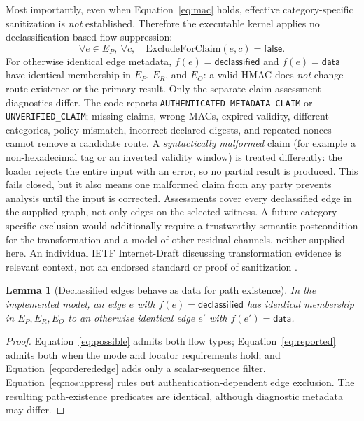 \documentclass[11pt,letterpaper]{article}
\newtheorem{lemma}{Lemma}
\newcommand{\st}[1]{\texttt{\scriptsize #1}}
\begin{document}
Most importantly, even when Equation~\eqref{eq:mac} holds, effective category-specific sanitization is \emph{not} established. Therefore the executable kernel applies no declassification-based flow suppression:
\begin{equation}
\forall e\in E_P,\ \forall c,\quad \mathrm{ExcludeForClaim}(e,c)=\mathsf{false}.\label{eq:nosuppress}
\end{equation}
For otherwise identical edge metadata, \(f(e)=\mathsf{declassified}\) and \(f(e)=\mathsf{data}\) have identical membership in \(E_P\), \(E_R\), and \(E_O\): a valid HMAC does \emph{not} change route existence or the primary result. Only the separate claim-assessment diagnostics differ. The code reports \st{AUTHENTICATED\_METADATA\_CLAIM} or \st{UNVERIFIED\_CLAIM}; missing claims, wrong MACs, expired validity, different categories, policy mismatch, incorrect declared digests, and repeated nonces cannot remove a candidate route. A \emph{syntactically malformed} claim (for example a non-hexadecimal tag or an inverted validity window) is treated differently: the loader rejects the entire input with an error, so no partial result is produced. This fails closed, but it also means one malformed claim from any party prevents analysis until the input is corrected. Assessments cover every declassified edge in the supplied graph, not only edges on the selected witness. A future category-specific exclusion would additionally require a trustworthy semantic postcondition for the transformation and a model of other residual channels, neither supplied here. An individual IETF Internet-Draft discussing transformation evidence is relevant context, not an endorsed standard or proof of sanitization \cite{drafttransform}.

\begin{lemma}[Declassified edges behave as data for path existence]\label{lem:declass}
In the implemented model, an edge \(e\) with \(f(e)=\mathsf{declassified}\)
has identical membership in \(E_P,E_R,E_O\) to an otherwise identical
edge \(e'\) with \(f(e')=\mathsf{data}\).
\end{lemma}
\begin{proof}
Equation~\eqref{eq:possible} admits both flow types;
Equation~\eqref{eq:reported} admits both when the mode and locator requirements
hold; and Equation~\eqref{eq:orderededge} adds only a scalar-sequence filter.
Equation~\eqref{eq:nosuppress} rules out authentication-dependent edge
exclusion. The resulting path-existence predicates are identical, although
diagnostic metadata may differ.
\end{proof}
\end{document}
